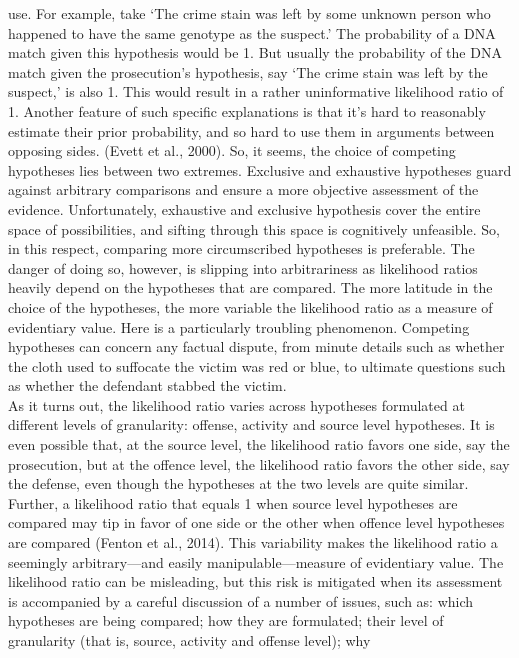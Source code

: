 \documentclass[10pt,dvipsnames,enabledeprecatedfontcommands]{scrartcl}
\begin{document}
use. For example, take `The crime stain was left by some unknown person
who happened to have the same genotype as the suspect.' The probability
of a DNA match given this hypothesis would be 1. But usually the
probability of the DNA match given the prosecution's hypothesis, say
`The crime stain was left by the suspect,' is also 1. This would result
in a rather uninformative likelihood ratio of 1. Another feature of such
specific explanations is that it's hard to reasonably estimate their
prior probability, and so hard to use them in arguments between opposing
sides. (Evett et al., 2000). So, it seems, the choice of competing
hypotheses lies between two extremes. Exclusive and exhaustive
hypotheses guard against arbitrary comparisons and ensure a more
objective assessment of the evidence. Unfortunately, exhaustive and
exclusive hypothesis cover the entire space of possibilities, and
sifting through this space is cognitively unfeasible. So, in this
respect, comparing more circumscribed hypotheses is preferable. The
danger of doing so, however, is slipping into arbitrariness as
likelihood ratios heavily depend on the hypotheses that are compared.
The more latitude in the choice of the hypotheses, the more variable the
likelihood ratio as a measure of evidentiary value. Here is a
particularly troubling phenomenon. Competing hypotheses can concern any
factual dispute, from minute details such as whether the cloth used to
suffocate the victim was red or blue, to ultimate questions such as
whether the defendant stabbed the victim.\\
As it turns out, the likelihood ratio varies across hypotheses
formulated at different levels of granularity: offense, activity and
source level hypotheses. It is even possible that, at the source level,
the likelihood ratio favors one side, say the prosecution, but at the
offence level, the likelihood ratio favors the other side, say the
defense, even though the hypotheses at the two levels are quite similar.
Further, a likelihood ratio that equals 1 when source level hypotheses
are compared may tip in favor of one side or the other when offence
level hypotheses are compared (Fenton et al., 2014). This variability
makes the likelihood ratio a seemingly arbitrary---and easily
manipulable---measure of evidentiary value. The likelihood ratio can be
misleading, but this risk is mitigated when its assessment is
accompanied by a careful discussion of a number of issues, such as:
which hypotheses are being compared; how they are formulated; their
level of granularity (that is, source, activity and offense level); why
\end{document}
